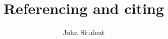 \documentclass[12pt]{scrartcl}
\title{Referencing and citing}
\author{John Student}
\begin{document}
	\maketitle
	
	 \citet{HamAndBurger2010}
\end{document}
